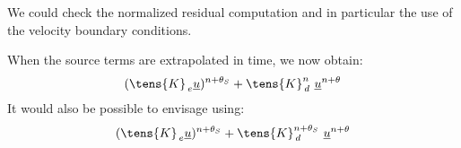 We could check the normalized residual computation and in particular the use of the velocity boundary conditions.

When the source terms are extrapolated in time, we now obtain:
\begin{equation}\notag
(\tens{K}_{\,e}\underline{u})^{n+\theta_S} + \tens{K}_{\,d}^{n}\ \underline{u}^{n+\theta}
\end{equation}
It would also be possible to envisage using:
\begin{equation}\notag
(\tens{K}_{\,e}\underline{u})^{n+\theta_S} + \tens{K}_{\,d}^{n+\theta_S}\ \underline{u}^{n+\theta}
\end{equation}
